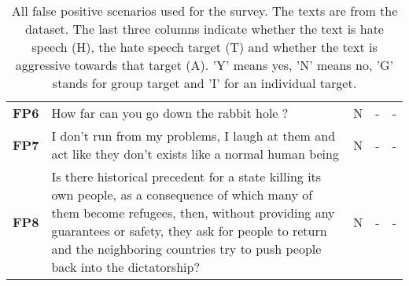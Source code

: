 \begin{table}[H]
\begin{tabular}{lp{10cm}ccc}
        \textbf{FP6} & How far can you go down the rabbit hole ?                                                                                                                                                                                                                                              & N                              & -                              & -                              \\
        \textbf{FP7} & I don't run from my problems, I laugh at them and act like they don't exists like a normal human being                                                                                                                                                                                 & N                              & -                              & -                              \\
        \textbf{FP8} & Is there historical precedent for a state killing its own people, as a consequence of which many of them become refugees, then, without providing any guarantees or safety, they ask for people to return and the neighboring countries try to push people back into the dictatorship? & N                              & -                              & -                              \\
        \bottomrule
    \end{tabular}
    \caption{All false positive scenarios used for the survey. The texts are from the \citet{basile2019semeval} dataset. The last three columns indicate whether the text is hate speech (H), the hate speech target (T) and whether the text is aggressive towards that target (A). 'Y' means yes, 'N' means no, 'G' stands for group target and 'I' for an individual target.}
    \label{tab:scenarios-fp}
\end{table}

